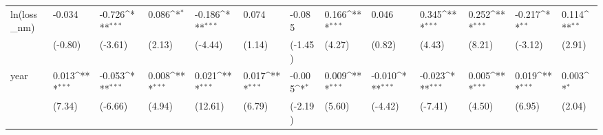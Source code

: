 \def\sym#1{\ifmmode^{#1}\else\(^{#1}\)\fi}
\begin{tabular}{p{1.5cm} p{1.7cm} p{1.7cm} p{1.7cm}  p{1.7cm} p{1.7cm} p{1.7cm} p{1.7cm} p{1.7cm}  p{1.7cm} p{1.7cm} p{1.7cm} p{1.7cm} }
\hline
ln(loss\_nm)     &   -0.034         &   -0.726\sym{***}&    0.086\sym{*}  &   -0.186\sym{***}&    0.074         &   -0.085         &    0.166\sym{***}&    0.046         &    0.345\sym{***}&    0.252\sym{***}&   -0.217\sym{**} &    0.114\sym{**} \\
                &  (-0.80)         &  (-3.61)         &   (2.13)         &  (-4.44)         &   (1.14)         &  (-1.45)         &   (4.27)         &   (0.82)         &   (4.43)         &   (8.21)         &  (-3.12)         &   (2.91)         \\
year            &    0.013\sym{***}&   -0.053\sym{***}&    0.008\sym{***}&    0.021\sym{***}&    0.017\sym{***}&   -0.005\sym{*}  &    0.009\sym{***}&   -0.010\sym{***}&   -0.023\sym{***}&    0.005\sym{***}&    0.019\sym{***}&    0.003\sym{*}  \\
                &   (7.34)         &  (-6.66)         &   (4.94)         &  (12.61)         &   (6.79)         &  (-2.19)         &   (5.60)         &  (-4.42)         &  (-7.41)         &   (4.50)         &   (6.95)         &   (2.04)         \\
\end{tabular}
